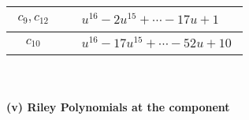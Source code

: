 \documentclass[1p]{elsarticle_modified}
\theoremstyle{definition}
\begin{document}
\begin{tabular}{m{50pt}|m{274pt}}
\hline $$\begin{aligned}c_{9},c_{12}\end{aligned}$$&$\begin{aligned}
&u^{16}-2 u^{15}+\cdots-17 u+1
\end{aligned}$\\
\hline $$\begin{aligned}c_{10}\end{aligned}$$&$\begin{aligned}
&u^{16}-17 u^{15}+\cdots-52 u+10
\end{aligned}$\\
\hline
\end{tabular}\\~\\
\newpage\renewcommand{\arraystretch}{1}
\flushleft \textbf{(v) Riley Polynomials at the component}\newline \\
\end{document}

